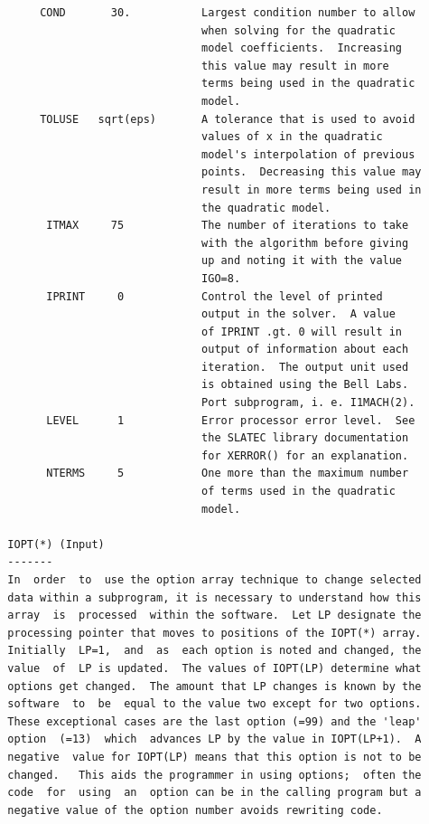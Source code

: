 \documentclass[11pt,twoside]{article}
\begin{document}
\begin{verbatim}
       COND       30.           Largest condition number to allow
                                when solving for the quadratic
                                model coefficients.  Increasing
                                this value may result in more
                                terms being used in the quadratic
                                model.
       TOLUSE   sqrt(eps)       A tolerance that is used to avoid
                                values of x in the quadratic
                                model's interpolation of previous
                                points.  Decreasing this value may
                                result in more terms being used in
                                the quadratic model.
        ITMAX     75            The number of iterations to take
                                with the algorithm before giving
                                up and noting it with the value
                                IGO=8.
        IPRINT     0            Control the level of printed
                                output in the solver.  A value
                                of IPRINT .gt. 0 will result in
                                output of information about each
                                iteration.  The output unit used
                                is obtained using the Bell Labs.
                                Port subprogram, i. e. I1MACH(2).
        LEVEL      1            Error processor error level.  See
                                the SLATEC library documentation
                                for XERROR() for an explanation.
        NTERMS     5            One more than the maximum number
                                of terms used in the quadratic
                                model.

  IOPT(*) (Input)
  -------
  In  order  to  use the option array technique to change selected
  data within a subprogram, it is necessary to understand how this
  array  is  processed  within the software.  Let LP designate the
  processing pointer that moves to positions of the IOPT(*) array.
  Initially  LP=1,  and  as  each option is noted and changed, the
  value  of  LP is updated.  The values of IOPT(LP) determine what
  options get changed.  The amount that LP changes is known by the
  software  to  be  equal to the value two except for two options.
  These exceptional cases are the last option (=99) and the 'leap'
  option  (=13)  which  advances LP by the value in IOPT(LP+1).  A
  negative  value for IOPT(LP) means that this option is not to be
  changed.   This aids the programmer in using options;  often the
  code  for  using  an  option can be in the calling program but a
  negative value of the option number avoids rewriting code.


\end{verbatim}
\end{document}
